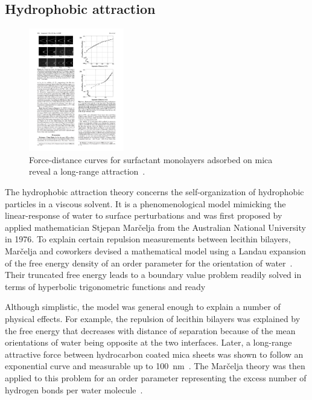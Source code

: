 \subsection{Hydrophobic attraction}
\begin{figure}
  \vspace{-37pt}
\centering
\includegraphics[width=0.37\textwidth]{figures/Background/LongRangeForce.pdf}
  \vspace{-20pt}
\caption{\label{fig:chandler_weeks} Force-distance curves for surfactant
  monolayers adsorbed on mica reveal a long-range
  attraction~\cite{Lin2005}.}
\end{figure}
The hydrophobic attraction theory concerns the self-organization of
hydrophobic particles in a viscous solvent. It is a phenomenological
model mimicking the linear-response of water to surface perturbations
and was first proposed by applied mathematician Stjepan Mar\v{c}elja
from the Australian National University in 1976. To explain certain
repulsion measurements between lecithin bilayers, Mar\v{c}elja and
coworkers devised a mathematical model using a Landau expansion of the
free energy density of an order parameter for the orientation of
water~\cite{LeRaPa77, MaRa76, LANDAULIFSHITZ5}. Their truncated free
energy leads to a boundary value problem readily solved in terms of
hyperbolic trigonometric functions and ready 

Although simplistic, the model was general enough to explain a number of
physical effects. For example, the repulsion of lecithin bilayers
was explained by the free energy that decreases with distance of
separation because of the mean orientations of water being opposite at
the two interfaces. Later, a long-range attractive force between
hydrocarbon coated mica sheets was shown to follow an exponential curve
and measurable up to 100~nm~\cite{ClCh88,RaDe88}. The Mar\v{c}elja
theory was then applied to this problem for an order parameter
representing the excess number of hydrogen bonds per water
molecule~\cite{ErLjCl89}.


